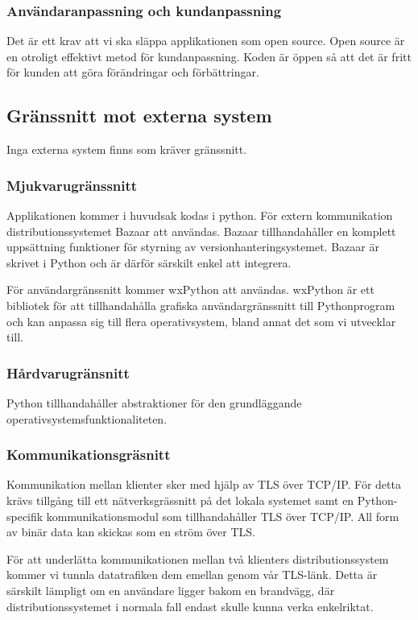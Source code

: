 \subsubsection{Användaranpassning och kundanpassning}
Det är ett krav att vi ska släppa applikationen som open source. Open source är en otroligt effektivt metod för kundanpassning. Koden är öppen så att det är fritt för kunden att göra förändringar och förbättringar. 

\subsection{Gränssnitt mot externa system}
Inga externa system finns som kräver gränssnitt. 

\subsubsection{Mjukvarugränssnitt}
Applikationen kommer i huvudsak kodas i python. För extern kommunikation distributionssystemet Bazaar att användas. Bazaar tillhandahåller en komplett uppsättning funktioner för styrning av versionhanteringsystemet. Bazaar är skrivet i Python och är därför särskilt enkel att integrera.

För användargränssnitt kommer wxPython att användas. wxPython är ett bibliotek för att tillhandahålla grafiska användargränssnitt till Pythonprogram och kan anpassa sig till flera operativsystem, bland annat det som vi utvecklar till.

\subsubsection{Hårdvarugränsnitt}
Python tillhandahåller abstraktioner för den grundläggande operativsystemsfunktionaliteten.

\subsubsection{Kommunikationsgräsnitt}
Kommunikation mellan klienter sker med hjälp av TLS över TCP/IP. För detta krävs tillgång till ett nätverksgrässnitt på det lokala systemet samt en Python-specifik kommunikationsmodul som tillhandahåller TLS över TCP/IP. All form av binär data kan skickas som en ström över TLS.

För att underlätta kommunikationen mellan två klienters distributionssystem kommer vi tunnla datatrafiken dem emellan genom vår TLS-länk. Detta är särskilt lämpligt om en användare ligger bakom en brandvägg, där distributionssystemet i normala fall endast skulle kunna verka enkelriktat.

